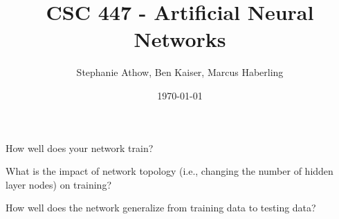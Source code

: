 \documentclass[•]{article}
\title{ CSC 447 - Artificial Neural Networks }
\author{Stephanie Athow, Ben Kaiser, Marcus Haberling}
\date{ \today }
\begin{document}
\maketitle

How well does your network train? 

What is the impact of network topology (i.e., changing the number of hidden layer nodes) on training? 

How well does the network generalize from training data to testing data?
\end{document}
